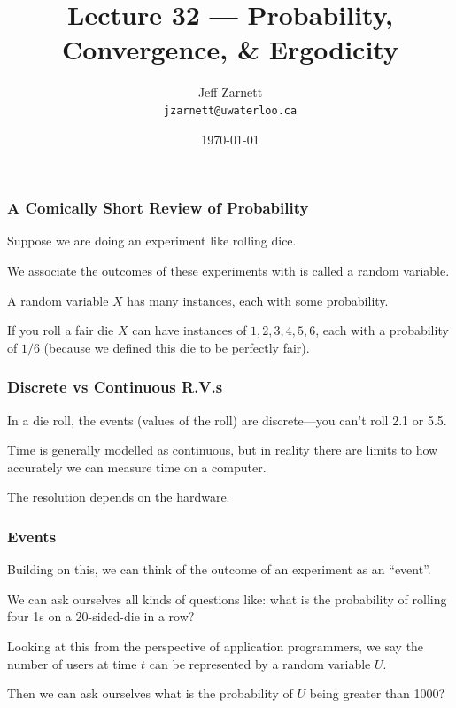 

\title{Lecture 32 --- Probability, Convergence, \& Ergodicity}

\author{Jeff Zarnett\\ \small \texttt{jzarnett@uwaterloo.ca}}
\date{\today}




\begin{frame}
  \titlepage

 \end{frame}



\begin{frame}
\frametitle{A Comically Short Review of Probability}

Suppose we are doing an experiment like rolling dice.

We associate the outcomes of these experiments with is called a random variable.

A random variable $X$ has many instances, each with some probability.

If you roll a fair die $X$ can have instances of ${1, 2, 3, 4, 5, 6}$, each with a probability of $1/6$ (because we defined this die to be perfectly fair).


\end{frame}



\begin{frame}
\frametitle{Discrete vs Continuous R.V.s}

In a die roll, the events (values of the roll) are discrete---you can't roll 2.1 or 5.5.

Time is generally modelled as continuous, but in reality there are limits to how accurately we can measure time on a computer. 

The resolution depends on the hardware. 

\end{frame}



\begin{frame}
\frametitle{Events}

Building on this, we can think of the outcome of an experiment as an ``event''. 

We can ask ourselves all kinds of questions like: what is the probability of rolling four 1s on a 20-sided-die in a row?

Looking at this from the perspective of application programmers, we say the number of users at time $t$ can be represented by a random variable $U$. 

Then we can ask ourselves what is the probability of $U$ being greater than 1000?

\end{frame}




